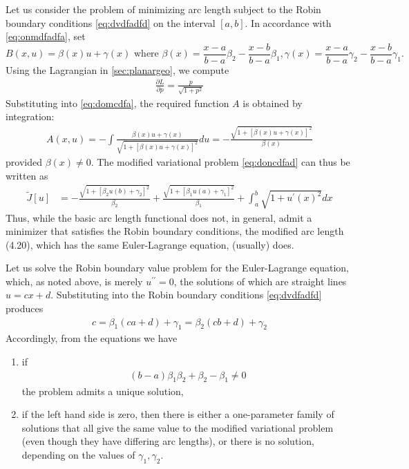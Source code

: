 \documentclass{article}
\begin{document}
\begin{exma}
Let us consider the problem of minimizing arc length subject to the Robin boundary conditions \cref{eq:dvdfadfd} on the interval $[a, b]$. In accordance with \cref{eq:onmdfadfa}, set
$$B(x, u)=\beta(x) u+\gamma(x)\text{ where }\beta(x)=\frac{x-a}{b-a} \beta_{2}-\frac{x-b}{b-a} \beta_{1}, \gamma(x)=\frac{x-a}{b-a} \gamma_{2}-\frac{x-b}{b-a} \gamma_{1} .$$
Using the Lagrangian in \cref{sec:planargeo}, we compute
\begin{align*}
\frac{\partial L}{\partial p}=\frac{p}{\sqrt{1+p^{2}}}
\end{align*}
Substituting into \cref{eq:domcdfa}, the required function $A$ is obtained by integration:
\begin{align*}
A(x, u)=-\int \frac{\beta(x) u+\gamma(x)}{\sqrt{1+[\beta(x) u+\gamma(x)]^{2}}} d u=-\frac{\sqrt{1+[\beta(x) u+\gamma(x)]^{2}}}{\beta(x)}
\end{align*}
provided $\beta(x)\ne 0$. The modified variational problem \cref{eq:doncdfad} can thus be written as
 \begin{align}
\widetilde{J}[u] &=-\frac{\sqrt{1+\left[\beta_{2} u(b)+\gamma_{2}\right]^{2}}}{\beta_{2}}+\frac{\sqrt{1+\left[\beta_{1} u(a)+\gamma_{1}\right]^{2}}}{\beta_{1}}+\int_{a}^{b} \sqrt{1+u^{\prime}(x)^{2}} d x
\end{align}
Thus, while the basic arc length functional does not, in general, admit a minimizer that satisfies the Robin boundary conditions, the modified arc length (4.20), which has the same Euler-Lagrange equation, (usually) does. 

Let us solve the Robin boundary value problem for the Euler-Lagrange equation, which, as noted above, is merely $u^{\prime \prime}=0$, the solutions of which are straight lines $u=c x+d$. Substituting into the Robin boundary conditions \cref{eq:dvdfadfd} produces
\begin{align*}
c=\beta_{1}(c a+d)+\gamma_{1}=\beta_{2}(c b+d)+\gamma_{2}
\end{align*}
Accordingly, from the equations we have
\begin{enumerate}
    \item if
\begin{align*}
(b-a) \beta_{1} \beta_{2}+\beta_{2}-\beta_{1} \neq 0
\end{align*}
the problem admits a unique solution,
\item if the left hand side is zero, then there is either a one-parameter family of solutions that all give the same value to the modified variational problem (even though they have differing arc lengths), or there is no solution, depending on the values of  $\gamma_{1}, \gamma_{2}$.
\end{enumerate} 
\end{exma}
\end{document}
